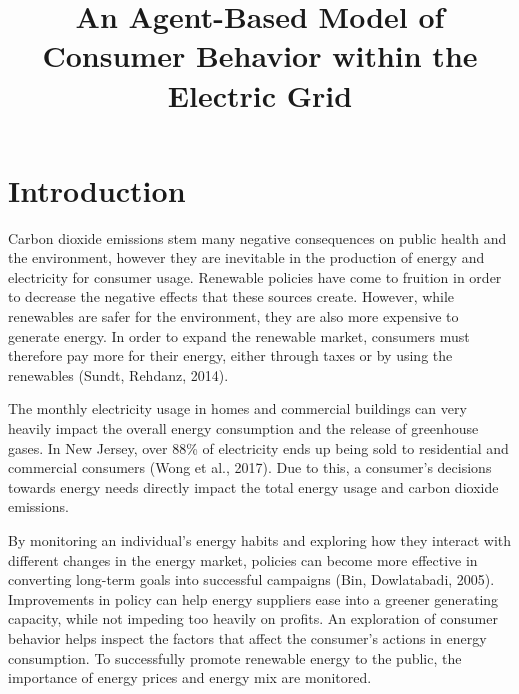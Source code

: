 \documentclass[jou,apacite]{apa6}
\title{An Agent-Based Model of Consumer Behavior within the Electric Grid}
\begin{document}
\maketitle    
                        
\section{Introduction}

Carbon dioxide emissions stem many negative consequences on public health and the environment, however they are inevitable in the production of energy and electricity for consumer usage. Renewable policies have come to fruition in order to decrease the negative effects that these sources create. However, while renewables are safer for the environment, they are also more expensive to generate energy. In order to expand the renewable market, consumers must therefore pay more for their energy, either through taxes or by using the renewables (Sundt, Rehdanz, 2014). 

The monthly electricity usage in homes and commercial buildings can very heavily impact the overall energy consumption and the release of greenhouse gases. In New Jersey, over 88\% of electricity ends up being sold to residential and commercial consumers (Wong et al., 2017). Due to this, a consumer's decisions towards energy needs directly impact the total energy usage and carbon dioxide emissions.

By monitoring an individual's energy habits and exploring how they interact with different changes in the energy market, policies can become more effective in converting long-term goals into successful campaigns (Bin, Dowlatabadi, 2005). Improvements in policy can help energy suppliers ease into a greener generating capacity, while not impeding too heavily on profits. An exploration of consumer behavior helps inspect the factors that affect the consumer's actions in energy consumption. To successfully promote renewable energy to the public, the importance of energy prices and energy mix are monitored.


\end{document}
